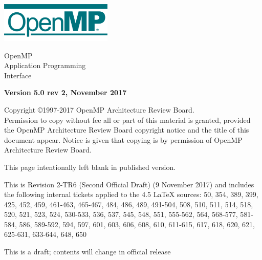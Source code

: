 
  \begin{titlepage}
    \begin{flushleft}
     \hspace{-6em} \includegraphics[width=0.4\textwidth]{openmp-logo.png}
    \end{flushleft}

    \begin{adjustwidth}{-0.75in}{0in}
    \begin{center}
      \Huge
      \textsf{OpenMP\\Application Programming\\Interface}

      \vspace{0.5in}\textsf{    }\vspace{-0.7in}
      \normalsize

      \vspace{1.0in}

      \textbf{Version 5.0 rev 2, November 2017}
    \end{center}
    \end{adjustwidth}

    \vspace{3.0in}

\begin{adjustwidth}{0pt}{1em}\setlength{\parskip}{0.25\baselineskip}%
Copyright \copyright 1997-2017 OpenMP Architecture Review Board.\\
Permission to copy without fee all or part of this material is granted,
provided the OpenMP Architecture Review Board copyright notice and
the title of this document appear. Notice is given that copying is by
permission of OpenMP Architecture Review Board.\end{adjustwidth}

  \end{titlepage}


\clearpage
\thispagestyle{empty}
\phantom{a}
This page intentionally left blank in published version.

This is Revision 2-TR6 (Second Official Draft) (9 November 2017) and
includes the following internal tickets applied to the 4.5 LaTeX sources:
50, 354, 389, 399, 425, 452, 459, 461-463, 465-467, 484, 486, 489, 491-504,
508, 510, 511, 514, 518, 520, 521, 523, 524, 530-533, 536, 537, 545, 548,
551, 555-562, 564, 568-577, 581-584, 586, 589-592, 594, 597, 601, 603, 606,
608, 610, 611-615, 617, 618, 620, 621, 625-631, 633-644, 648, 650

This is a draft; contents will change in official release

\vfill

